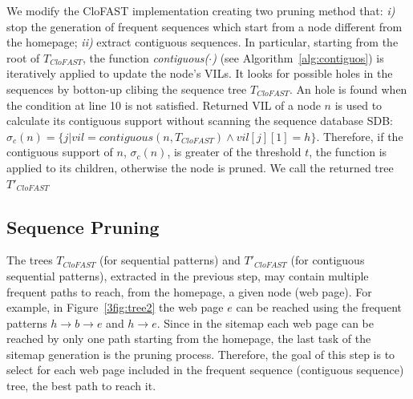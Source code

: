 We modify the CloFAST implementation creating two pruning method that: \emph{i)} stop the generation of frequent sequences which start from a node different from the homepage; \emph{ii)} extract contiguous sequences. In particular, starting from the root of $T_{CloFAST}$, the function \textit{contiguous($\cdot$)} (see Algorithm~\ref{alg:contiguos}) is iteratively applied to update the node's VILs. It looks for possible holes in the sequences by botton-up clibing the sequence tree $T_{CloFAST}$. An hole is found when the condition at line 10 is not satisfied. Returned VIL of a node $n$ is used to calculate its contiguous support without scanning the sequence database SDB:
$\sigma_c(n) = \{j|vil = contiguous(n, T_{CloFAST}) \wedge  vil[j][1]= h\}$.
Therefore, if the contiguous support of $n$, $\sigma_c(n)$, is greater of the threshold $t$, the function is applied to its children, otherwise the node is pruned. We call the returned tree $T'_{CloFAST}$

\subsection{Sequence Pruning}
The trees $T_{CloFAST}$ (for sequential patterns) and $T'_{CloFAST}$ (for contiguous sequential patterns), extracted in the previous step, may contain multiple frequent paths to reach, from the homepage, a given node (web page). For example, in Figure~\ref{3fig:tree2} the web page $e$ can be reached using the frequent patterns $h\rightarrow b \rightarrow e$ and $h\rightarrow e$.
Since in the sitemap each web page can be reached by only one path starting from the homepage, the last task of the sitemap generation is the pruning process. Therefore, the goal of this step is to select for each web page included in the frequent sequence (contiguous sequence) tree, the best path to reach it.

